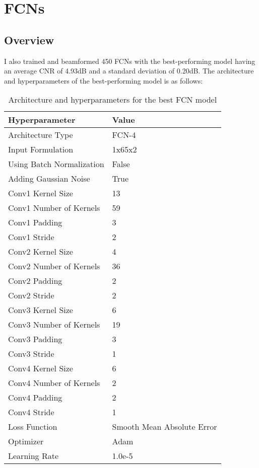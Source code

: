 \section{FCNs}
\subsection{Overview}
  I also trained and beamformed 450 FCNs with the best-performing model having an average CNR of 4.93dB and a standard deviation of 0.20dB. The architecture and hyperparameters of the best-performing model is as follows:

  \begin{table}[]
  \vspace*{5mm}
  \centering
  \renewcommand\arraystretch{0.9}
  \begin{tabular}{@{}ll@{}}
  Hyperparameter & Value \\ \midrule
  Architecture Type & FCN-4 \\
  Input Formulation & 1x65x2 \\
  Using Batch Normalization & False \\
  Adding Gaussian Noise & True \\

  Conv1 Kernel Size & 13 \\
  Conv1 Number of Kernels & 59 \\
  Conv1 Padding & 3 \\
  Conv1 Stride & 2 \\

  Conv2 Kernel Size & 4 \\
  Conv2 Number of Kernels & 36 \\
  Conv2 Padding & 2 \\
  Conv2 Stride & 2 \\

  Conv3 Kernel Size & 6 \\
  Conv3 Number of Kernels & 19 \\
  Conv3 Padding & 3 \\
  Conv3 Stride & 1 \\

  Conv4 Kernel Size & 6 \\
  Conv4 Number of Kernels & 2 \\
  Conv4 Padding & 2 \\
  Conv4 Stride & 1 \\


  Loss Function & Smooth Mean Absolute Error \\
  Optimizer & Adam \\
  Learning Rate & 1.0e-5 \\ \bottomrule
  \end{tabular}
  \vspace{0.5mm}
  \caption{Architecture and hyperparameters for the best FCN model}
  \end{table}

